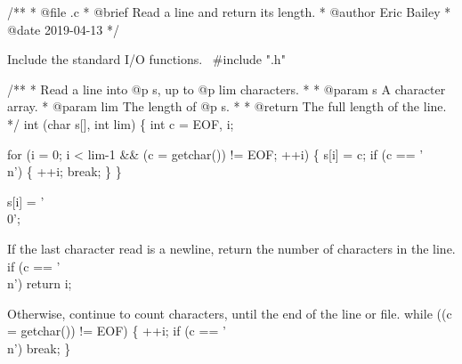 \nwendcode{}\nwdocspar


\nwenddocs{}\endmoddef\nwstartdeflinemarkup{}\nwenddeflinemarkup
/**
 * @file .c
 * @brief Read a line and return its length.
 * @author Eric Bailey
 * @date 2019-04-13
 */


\LA{}Include the standard I/O functions.~{\nwtagstyle{}}\RA{}
#include ".h"


/**
 * Read a line into @p s, up to @p lim characters.
 *
 * @param s A character array.
 * @param lim The length of @p s.
 *
 * @return The full length of the line.
 */
int (char s[], int lim)
\{
    int c = EOF, i;

    for (i = 0; i < lim-1 && (c = getchar()) != EOF; ++i) \{
        s[i] = c;
        if (c == '\\n') \{
            ++i;
            break;
        \}
    \}

    s[i] = '\\0';

\nwendcode{}\nwdocspar

If the last character read is a newline, return the number of characters in the line.
\nwenddocs{}\plusendmoddef\nwstartdeflinemarkup{}\nwenddeflinemarkup
    if (c == '\\n')
        return i;

\nwendcode{}\nwdocspar

Otherwise, continue to count characters, until the end of the line or file.
\nwenddocs{}\plusendmoddef\nwstartdeflinemarkup{}\nwenddeflinemarkup
    while ((c = getchar()) != EOF) \{
        ++i;
        if (c == '\\n')
            break;
    \}

